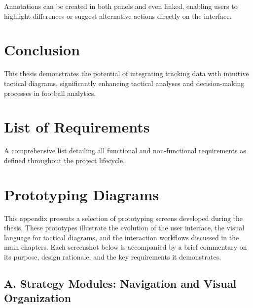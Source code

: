 \documentclass[11pt,a4paper,openright]{report}
\begin{document}
Annotations can be created in both panels and even linked, enabling users to highlight differences or suggest alternative actions directly on the interface.

\chapter{Conclusion} 
This thesis demonstrates the potential of integrating tracking data with intuitive tactical diagrams, significantly enhancing tactical analyses and decision-making processes in football analytics.

\clearpage
\printbibliography[heading=bibintoc]

\appendix
\chapter{List of Requirements} 
A comprehensive list detailing all functional and non-functional requirements as defined throughout the project lifecycle.

\chapter{Prototyping Diagrams}

This appendix presents a selection of prototyping screens developed during the thesis. These prototypes illustrate the evolution of the user interface, the visual language for tactical diagrams, and the interaction workflows discussed in the main chapters. Each screenshot below is accompanied by a brief commentary on its purpose, design rationale, and the key requirements it demonstrates.

\section*{A. Strategy Modules: Navigation and Visual Organization}
\end{document}
